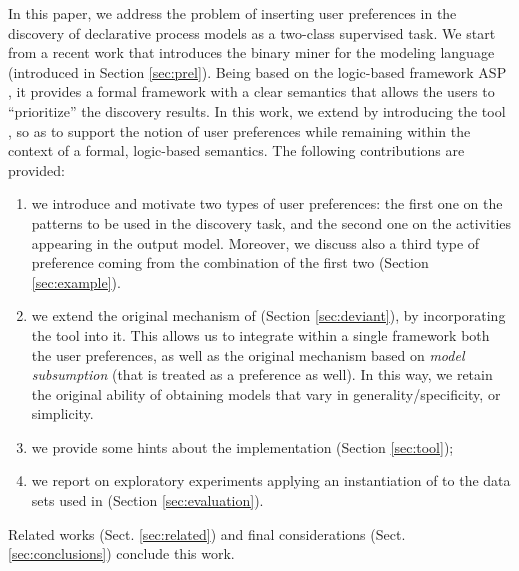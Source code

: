 In this paper, we address the problem of inserting user preferences in the discovery of declarative process models as a two-class supervised task. We start from a recent work \cite{deviant-tkde} that introduces the \nd binary miner for the \declare modeling language \cite{DBLP:conf/edoc/PesicSA07} (introduced in Section \ref{sec:prel}). Being \nd based on the logic-based framework ASP \cite{asp-intro}, it provides a formal framework with a clear semantics that allows the users to ``prioritize'' the discovery results. In this work, we extend \nd by introducing the \asprin tool \cite{DBLP:conf/aaai/BrewkaD0S15}, so as to support the notion of user preferences while remaining within the context of a formal, logic-based semantics. The following contributions are provided:
%
\begin{enumerate}[{(i)}]
    \item we introduce and motivate two types of user preferences: the first one on the \declare patterns to be used in the discovery task, and the second one on the activities appearing in the output model. Moreover, we discuss also a third type of preference coming from the combination of the first two (Section \ref{sec:example}).
	\item we extend the original mechanism of \nd (Section \ref{sec:deviant}), by incorporating the \asprin tool \cite{DBLP:conf/aaai/BrewkaD0S15} into it. This allows us to integrate within a single framework both the user preferences, as well as the original \nd mechanism based on \emph{model subsumption} (that is treated as a preference as well). In this way, we retain the original ability of obtaining models that vary in generality/specificity, or simplicity.
	\item we provide some hints about the implementation (Section \ref{sec:tool});   
	\item we report on exploratory experiments applying an instantiation of \nd  to the data sets used in \cite{2007b-Lamma,DBLP:conf/bpm/SlaatsDB21} (Section \ref{sec:evaluation}).
\end{enumerate}
Related works (Sect. \ref{sec:related}) and final considerations (Sect. \ref{sec:conclusions}) conclude this work.

